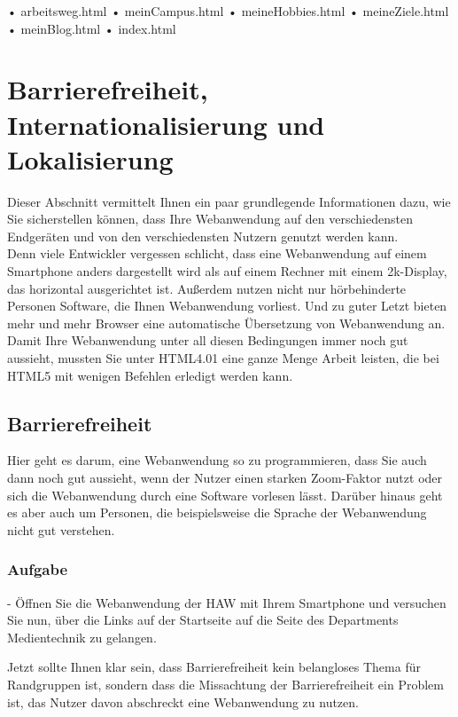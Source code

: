 •	arbeitsweg.html
•	meinCampus.html
•	meineHobbies.html
•	meineZiele.html
•	meinBlog.html
•	index.html

\section{Barrierefreiheit, Internationalisierung und Lokalisierung}

Dieser Abschnitt vermittelt Ihnen ein paar grundlegende Informationen dazu, wie Sie sicherstellen können, dass Ihre Webanwendung auf den verschiedensten Endgeräten und von den verschiedensten Nutzern genutzt werden kann.\\

Denn viele Entwickler vergessen schlicht, dass eine Webanwendung auf einem Smartphone anders dargestellt wird als auf einem Rechner mit einem 2k-Display, das horizontal ausgerichtet ist. Außerdem nutzen nicht nur hörbehinderte Personen Software, die Ihnen Webanwendung vorliest. Und zu guter Letzt bieten mehr und mehr Browser eine automatische Übersetzung von Webanwendung an.\\

Damit Ihre Webanwendung unter all diesen Bedingungen immer noch gut aussieht, mussten Sie unter HTML4.01 eine ganze Menge Arbeit leisten, die bei HTML5 mit wenigen Befehlen erledigt werden kann.

\subsection{Barrierefreiheit}

Hier geht es darum, eine Webanwendung so zu programmieren, dass Sie auch dann noch gut aussieht, wenn der Nutzer einen starken Zoom-Faktor nutzt oder sich die Webanwendung durch eine Software vorlesen lässt. Darüber hinaus geht es aber auch um Personen, die beispielsweise die Sprache der Webanwendung nicht gut verstehen.

\subsubsection{Aufgabe}

-	Öffnen Sie die Webanwendung der HAW mit Ihrem Smartphone und versuchen Sie nun, über die Links auf der Startseite auf die Seite des Departments Medientechnik zu gelangen.

Jetzt sollte Ihnen klar sein, dass Barrierefreiheit kein belangloses Thema für Randgruppen ist, sondern dass die Missachtung der Barrierefreiheit ein Problem ist, das Nutzer davon abschreckt eine Webanwendung zu nutzen.\\

